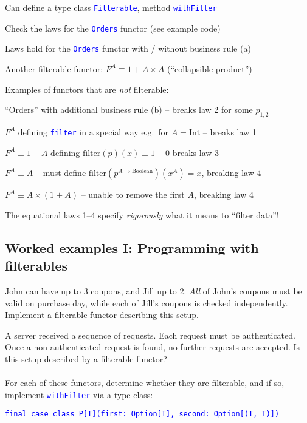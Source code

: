 Can define a type class \texttt{\textcolor{blue}{\footnotesize{}Filterable}},
method \texttt{\textcolor{blue}{\footnotesize{}withFilter}} 

Check the laws for the \texttt{\textcolor{blue}{\footnotesize{}Orders}}
functor (see example code)

Laws hold for the \texttt{\textcolor{blue}{\footnotesize{}Orders}}
functor with / without business rule (a)

Another filterable functor: $F^{A}\equiv1+A\times A$ (``collapsible
product'')

Examples of functors that are \emph{not} filterable:

``Orders'' with additional business rule (b) – breaks law 2 for
some $p_{1,2}$

$F^{A}$ defining \texttt{\textcolor{blue}{\footnotesize{}filter}}
in a special way e.g.~for $A=\text{Int}$ – breaks law 1

$F^{A}\equiv1+A$ defining $\text{filter}\left(p\right)\left(x\right)\equiv1+0$
breaks law 3

$F^{A}\equiv A$ – must define $\text{filter}\left(p^{A\Rightarrow\text{Boolean}}\right)\left(x^{A}\right)=x$,
breaking law 4

$F^{A}\equiv A\times\left(1+A\right)$ – unable to remove the first
$A$, breaking law 4

The equational laws 1–4 specify \emph{rigorously} what it means to
``filter data''!


\subsection{Worked examples I: Programming with filterables}

John can have up to 3 coupons, and Jill up to 2. \emph{All} of John's
coupons must be valid on purchase day, while each of Jill's coupons
is checked independently. Implement a filterable functor describing
this setup.

A server received a sequence of requests. Each request must be authenticated.
Once a non-authenticated request is found, no further requests are
accepted. Is this setup described by a filterable functor?\\
\ \\
For each of these functors, determine whether they are filterable,
and if so, implement \texttt{\textcolor{blue}{\footnotesize{}withFilter}}
via a type class:

\texttt{\textcolor{blue}{\footnotesize{}final case class P{[}T{]}(first:\ Option{[}T{]},
second:\ Option{[}(T, T){]})}}{\footnotesize\par}

